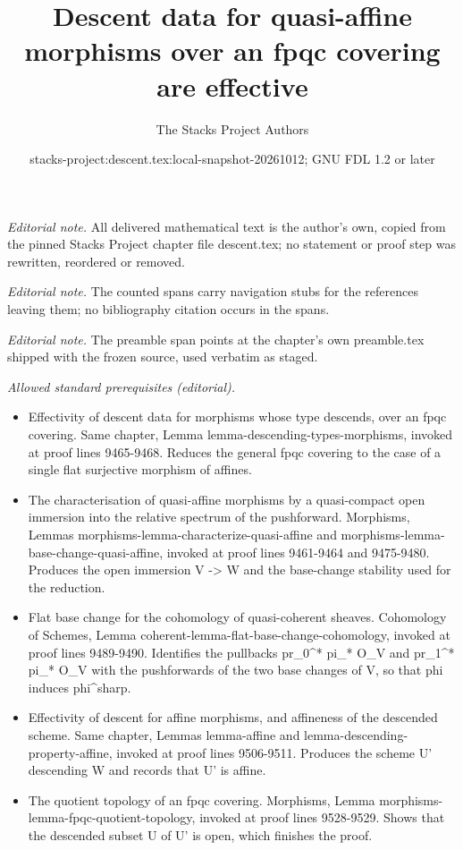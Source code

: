 \documentclass{stacks-project}
\title{Descent data for quasi-affine morphisms over an fpqc covering are effective}
\author{The Stacks Project Authors}
\date{stacks-project:descent.tex:local-snapshot-20261012; GNU FDL 1.2 or later}
\theoremstyle{plain}
\theoremstyle{definition}
\theoremstyle{remark}
\numberwithin{equation}{subsection}
\begin{document}
\maketitle
\noindent\textit{Editorial note.} All delivered mathematical text is the author's own, copied from the pinned Stacks Project chapter file descent.tex; no statement or proof step was rewritten, reordered or removed.\par\medskip
\noindent\textit{Editorial note.} The counted spans carry navigation stubs for the references leaving them; no bibliography citation occurs in the spans.\par\medskip
\noindent\textit{Editorial note.} The preamble span points at the chapter's own preamble.tex shipped with the frozen source, used verbatim as staged.\par\medskip
\noindent\textit{Allowed standard prerequisites (editorial).}\begin{itemize}
\item Effectivity of descent data for morphisms whose type descends, over an fpqc covering. Same chapter, Lemma lemma-descending-types-morphisms, invoked at proof lines 9465-9468. Reduces the general fpqc covering to the case of a single flat surjective morphism of affines.
\item The characterisation of quasi-affine morphisms by a quasi-compact open immersion into the relative spectrum of the pushforward. Morphisms, Lemmas morphisms-lemma-characterize-quasi-affine and morphisms-lemma-base-change-quasi-affine, invoked at proof lines 9461-9464 and 9475-9480. Produces the open immersion V -> W and the base-change stability used for the reduction.
\item Flat base change for the cohomology of quasi-coherent sheaves. Cohomology of Schemes, Lemma coherent-lemma-flat-base-change-cohomology, invoked at proof lines 9489-9490. Identifies the pullbacks pr\_0\textasciicircum{}* pi\_* O\_V and pr\_1\textasciicircum{}* pi\_* O\_V with the pushforwards of the two base changes of V, so that phi induces phi\textasciicircum{}sharp.
\item Effectivity of descent for affine morphisms, and affineness of the descended scheme. Same chapter, Lemmas lemma-affine and lemma-descending-property-affine, invoked at proof lines 9506-9511. Produces the scheme U' descending W and records that U' is affine.
\item The quotient topology of an fpqc covering. Morphisms, Lemma morphisms-lemma-fpqc-quotient-topology, invoked at proof lines 9528-9529. Shows that the descended subset U of U' is open, which finishes the proof.
\end{itemize}\medskip
\end{document}
